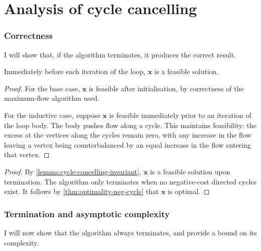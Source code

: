 \section{Analysis of cycle cancelling} \label{appendix:impl-cc-analysis}

\subsubsection{Correctness} \label{appendix:impl-cc-analysis:correctness}

I will show that, if the algorithm terminates, it produces the correct result. \\

\begin{lemma} \label{lemma:cycle-cancelling-invariant}
    Immediately before each iteration of the loop, $\mathbf{x}$ is a feasible solution.
\end{lemma} 
\begin{proof}
    For the base case, $\mathbf{x}$ is feasible after initialisation, by correctness of the maximum-flow algorithm used.
    
    For the inductive case, suppose $\mathbf{x}$ is feasible immediately prior to an iteration of the loop body. The body pushes flow along a cycle. This maintains feasibility: the excess at the vertices along the cycles remain zero, with any increase in the flow leaving a vertex being counterbalanced by an equal increase in the flow entering that vertex.
\end{proof}

\cccorrectness*
\begin{proof}
By \cref{lemma:cycle-cancelling-invariant}, $\mathbf{x}$ is a feasible solution upon termination. The algorithm only terminates when no negative-cost directed cycles exist. It follows by \cref{thm:optimality-neg-cycle} that $\mathbf{x}$ is optimal.
\end{proof}

\subsubsection{Termination and asymptotic complexity} \label{appendix:impl-cc-analysis:complexity}

I will now show that the algorithm always terminates, and provide a bound on its complexity.\\

